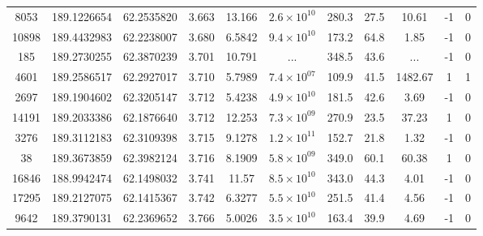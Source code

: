 \begin{table}
\begin{tabular}{ccccccccccc}
       8053 &                  189.1226654 &                 62.2535820 &          3.663 &           13.166 & $2.6\times10^{10}$ &          280.3 &        27.5 &       10.61 &               -1 &                  0 \\
      10898 &                  189.4432983 &                 62.2238007 &          3.680 &           6.5842 & $9.4\times10^{10}$ &          173.2 &        64.8 &        1.85 &               -1 &                  0 \\
        185 &                  189.2730255 &                 62.3870239 &          3.701 &           10.791 &                ... &          348.5 &        43.6 &         ... &               -1 &                  0 \\
       4601 &                  189.2586517 &                 62.2927017 &          3.710 &           5.7989 & $7.4\times10^{07}$ &          109.9 &        41.5 &     1482.67 &                1 &                  1 \\
       2697 &                  189.1904602 &                 62.3205147 &          3.712 &           5.4238 & $4.9\times10^{10}$ &          181.5 &        42.6 &        3.69 &               -1 &                  0 \\
      14191 &                  189.2033386 &                 62.1876640 &          3.712 &           12.253 & $7.3\times10^{09}$ &          270.9 &        23.5 &       37.23 &                1 &                  0 \\
       3276 &                  189.3112183 &                 62.3109398 &          3.715 &           9.1278 & $1.2\times10^{11}$ &          152.7 &        21.8 &        1.32 &               -1 &                  0 \\
         38 &                  189.3673859 &                 62.3982124 &          3.716 &           8.1909 & $5.8\times10^{09}$ &          349.0 &        60.1 &       60.38 &                1 &                  0 \\
      16846 &                  188.9942474 &                 62.1498032 &          3.741 &            11.57 & $8.5\times10^{10}$ &          343.0 &        44.3 &        4.01 &               -1 &                  0 \\
      17295 &                  189.2127075 &                 62.1415367 &          3.742 &           6.3277 & $5.5\times10^{10}$ &          251.5 &        41.4 &        4.56 &               -1 &                  0 \\
       9642 &                  189.3790131 &                 62.2369652 &          3.766 &           5.0026 & $3.5\times10^{10}$ &          163.4 &        39.9 &        4.69 &               -1 &                  0 \\

\end{tabular}
\end{table}
